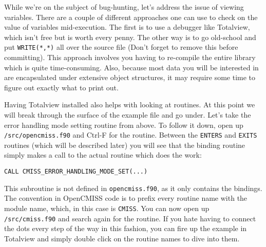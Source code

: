 While we're on the subject of bug-hunting, let's address the issue of viewing variables. There
are a couple of different approaches one can use to check on the value of variables mid-execution.
The first is to use a debugger like Totalview, which isn't free but is worth every penny. The 
other way is to go old-school and put \texttt{WRITE(*,*)} all over the source file (Don't forget 
to remove this before committing). This approach involves you having to re-compile the entire 
library which is quite time-consuming. Also, because most data you will be interested in are 
encapsulated under extensive object structures, it may require some time to figure out exactly 
what to print out.

Having Totalview installed also helps with looking at routines. At this point we will break 
through the surface of the example file and go under. Let's take the error handling mode setting
routine from above. To follow it down, open up \texttt{/src/opencmiss.f90} and Ctrl-F for the routine.
Between the \texttt{ENTERS} and \texttt{EXITS} routines (which will be described later) you will
see that the binding routine simply makes a call to the actual routine which does the work:
\begin{lstlisting}
CALL CMISS_ERROR_HANDLING_MODE_SET(...)
\end{lstlisting}
This subroutine is not defined in \texttt{opencmiss.f90}, as it only contains the bindings. The
convention in OpenCMISS code is to prefix every routine name with the module name, which, in this
case is \texttt{CMISS}. You can now open up \texttt{/src/cmiss.f90} and search again for the routine.
If you hate having to connect the dots every step of the way in this fashion, you can fire up the
example in Totalview and simply double click on the routine names to dive into them.


